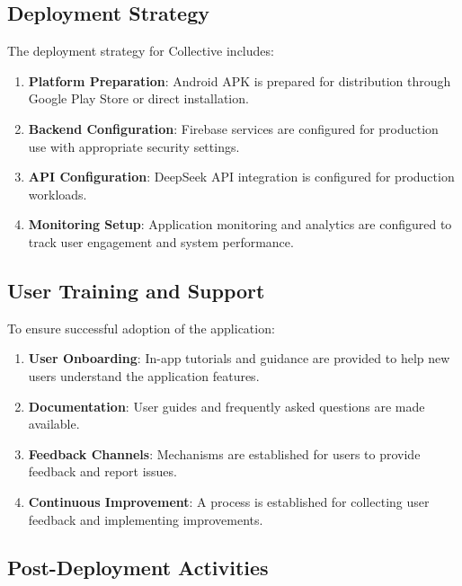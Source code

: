 \subsection{Deployment Strategy}\label{subsec:deploymentStrategy}

The deployment strategy for Collective includes:

\begin{enumerate}
    \item \textbf{Platform Preparation}: Android APK is prepared for distribution through Google Play Store or direct installation.
    
    \item \textbf{Backend Configuration}: Firebase services are configured for production use with appropriate security settings.
    
    \item \textbf{API Configuration}: DeepSeek API integration is configured for production workloads.
    
    \item \textbf{Monitoring Setup}: Application monitoring and analytics are configured to track user engagement and system performance.
\end{enumerate}

\subsection{User Training and Support}\label{subsec:userSupport}

To ensure successful adoption of the application:

\begin{enumerate}
    \item \textbf{User Onboarding}: In-app tutorials and guidance are provided to help new users understand the application features.
    
    \item \textbf{Documentation}: User guides and frequently asked questions are made available.
    
    \item \textbf{Feedback Channels}: Mechanisms are established for users to provide feedback and report issues.
    
    \item \textbf{Continuous Improvement}: A process is established for collecting user feedback and implementing improvements.
\end{enumerate}

\subsection{Post-Deployment Activities}\label{subsec:postDeployment}

